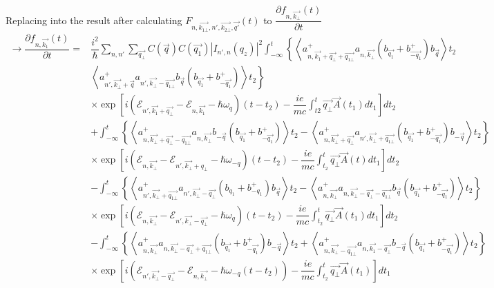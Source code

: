 \documentclass{article}
\begin{document}
Replacing into the result after calculating $F_{n,\vec{k_{1\bot}},n',\vec{k_{2\bot}},\vec{q'}}(t)$ to $\dfrac{\partial f_{n,\vec{k_{\bot}}}(t)}{\partial t}$
\begin{align*}
    \to \dfrac{\partial f_{n,\vec{k_1}}(t)}{\partial t}  = &\dfrac{i^2}{\hbar}\sum_{n,n'}\sum_{\vec{q_{\bot}}}C\left(\vec{q}\right)C \left(\vec{q_1}\right) |I_{n',n} (q_z)|^2 \int^t_{-\infty} \left\{\left\langle a^+_{n,\vec{k_1}+\vec{q_{\bot}}+\vec{q_{1\bot}}} a_{n,\vec{k_\bot}} \left(b_{\vec{q_1}}+b^+_{\vec{-q_1}}\right)b_{\vec{q}}\right\rangle t_2  \right. \\
   &  \left. \left\langle a^+_{n',\vec{k_\bot}+\vec{q}} a_{n',\vec{k_{\bot}}-\vec{q_{1\bot}}} b_{\vec{q}}\left(b_{\vec{q_1}}+ b^+_{-\vec{q_1}}\right)\right\rangle t_2 \right\}  \\
   & \times \exp \left[ i \left(\mathcal{E}_{n',\vec{k_1}+\vec{q_{\bot}}}- \mathcal{E}_{n,\vec{k_1}}-\hbar\omega_{q}\right)(t-t_2) - \dfrac{i e}{mc}\int^t_{t2}\vec{q_{\bot}}\vec{A}(t_1) dt_1\right]  dt_2 \\
   & + \int^t_{-\infty} \left\{ \left\langle a^+_{n,\vec{k_{\bot}}+\vec{q_{\bot}}-\vec{q_{1\bot}}}a_{n,\vec{k_{\bot}}}b_{-\vec{q}}\left(b_{\vec{q_1}}+ b^+_{-\vec{q_1}}\right)\right\rangle t_2  - \left\langle a^+_{n, \vec{k_{\bot}}+ \vec{q_{\bot}}}a_{n',\vec{k_{\bot}}+\vec{q_{1\bot}}}\left(b_{\vec{q_1}}+b^+_{-\vec{q_1}}\right)b_{-\vec{q}}\right\rangle t_2 \right \} \\
   & \times \exp \left[i\left(\mathcal{E}_{n,\vec{k_{\bot}}}-\mathcal{E}_{n',\vec{k_{\bot}}+q_{\bot}}-\hbar\omega_{-q}\right)(t-t_2) - \dfrac{ie}{mc} \int^t_{t_2} \vec{q_{\bot}} \vec{A}(t)dt_1 \right ] dt_2 \\
   & - \int^t_{-\infty} \left \{ \left \langle a^+_{n',\vec{k_\bot}+\vec{q_{1\bot}}}a_{n',\vec{k_\bot}-\vec{q_\bot}}\left (b_{q_1}+b^+_{-q_1}\right)b_{\vec{q}}\right\rangle t_2- \left\langle a^+_{n,\vec{k_{\bot}}}a_{n,\vec{k_\bot}-\vec{q_\bot}-\vec{q_{1\bot}}}b_{\vec{q}}\left(b_{\vec{q_1}}+b^+_{-\vec{q_1}}\right)\right\rangle t_2\right\} \\
   & \times \exp \left[i \left(\mathcal{E}_{n,\vec{k_\bot}}-\mathcal{E}_{n',\vec{k_\bot}-\vec{q_\bot}}-\hbar\omega_q\right)(t-t_2) -\dfrac{ie}{mc}\int^t_{t_2}\vec{q_\bot}\vec{A}(t_1)dt_1 \right] dt_2  \\
   & - \int^t_{-\infty} \left\{\left\langle a^+_{n,\vec{k_\bot}}a_{n,\vec{k_\bot}-\vec{q_\bot}+\vec{q_{1\bot}}}\left(b_{\vec{q_1}}+b^+_{-\vec{q_1}}\right)b_{-\vec{q}}\right\rangle t_2 + \left\langle a^+_{n,\vec{k_\bot}-\vec{q_{1\bot}}}a_{n,\vec{k_1}-\vec{q_\bot}} b_{-\vec{q}} \left(b_{\vec{q_1}}+ b^+_{-\vec{q_1}}\right) \right\rangle t_2 \right\} \\
   & \times \exp\left[i \left(\mathcal{E}_{n',\vec{k_\bot}-\vec{q_\bot}}-\mathcal{E}_{n,\vec{k_\bot}}-\hbar\omega_{-q}(t-t_2) \right)-\dfrac{ie}{mc} \int^t_{t_2}\vec{q_\bot} \vec{A}(t_1)\right] dt_1
\end{align*}
\end{document}
